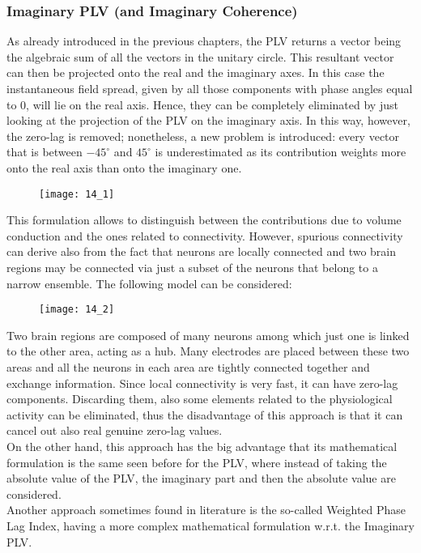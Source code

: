 \subsubsection{Imaginary PLV (and Imaginary Coherence)}
As already introduced in the previous chapters, the PLV returns a vector being the algebraic sum of all the
vectors in the unitary circle. This resultant vector can then be projected onto the real and the imaginary axes.
In this case the instantaneous field spread, given by all those components with phase angles equal to 0, will
lie on the real axis. Hence, they can be completely eliminated by just looking at the projection of the PLV on
the imaginary axis. In this way, however, the zero-lag is removed; nonetheless, a new problem is introduced:
every vector that is between \(-45^\circ\) and \(45^\circ\) is underestimated as its contribution weights
more onto the real axis than onto the imaginary one.
\begin{figure}[H]
    \centering
    \texttt{[image: 14\_1]}
\end{figure}
This formulation allows to distinguish between the contributions due to volume conduction and the ones
related to connectivity. However, spurious connectivity can derive also from the fact that neurons are
locally connected and two brain regions may be connected via just a subset of the neurons that belong to
a narrow ensemble. The following model can be considered:
\begin{figure}[H]
    \centering
    \texttt{[image: 14\_2]}
\end{figure}
Two brain regions are composed of many neurons among which just one is linked to the other area,
acting as a hub. Many electrodes are placed between these two areas and all the neurons in each area are
tightly connected together and exchange information. Since local connectivity is very fast, it can have
zero-lag components. Discarding them, also some elements related to the physiological activity can be
eliminated, thus the disadvantage of this approach is that it can cancel out also real genuine zero-lag
values.\\
On the other hand, this approach has the big advantage that its mathematical formulation is the same
seen before for the PLV, where instead of taking the absolute value of the PLV, the imaginary part and
then the absolute value are considered.\\
Another approach sometimes found in literature is the so-called Weighted Phase Lag Index, having a more
complex mathematical formulation w.r.t. the Imaginary PLV.

